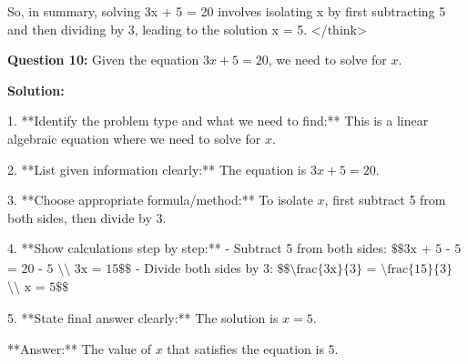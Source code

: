 So, in summary, solving 3x + 5 = 20 involves isolating x by first subtracting 5 and then dividing by 3, leading to the solution x = 5.
</think>

\textbf{Question 10:}  
Given the equation \(3x + 5 = 20\), we need to solve for \(x\).

\textbf{Solution:}

1. **Identify the problem type and what we need to find:** This is a linear algebraic equation where we need to solve for \(x\).

2. **List given information clearly:** The equation is \(3x + 5 = 20\).

3. **Choose appropriate formula/method:** To isolate \(x\), first subtract 5 from both sides, then divide by 3.

4. **Show calculations step by step:**
   - Subtract 5 from both sides:
     \[
     3x + 5 - 5 = 20 - 5 \\
     3x = 15
     \]
   - Divide both sides by 3:
     \[
     \frac{3x}{3} = \frac{15}{3} \\
     x = 5
     \]

5. **State final answer clearly:** The solution is \(x = 5\).

**Answer:**
The value of \(x\) that satisfies the equation is \(\boxed{5}\).